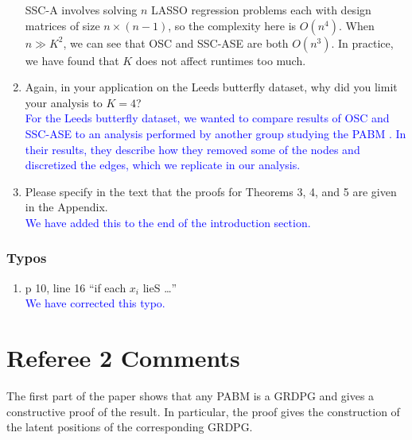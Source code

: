 \documentclass[
]{article}
\providecommand{\tightlist}{%
  \setlength{\itemsep}{0pt}\setlength{\parskip}{0pt}}
\begin{document}
\begin{enumerate}
{  SSC-A involves solving $n$ LASSO regression problems each with design matrices of size $n \times (n - 1)$, so the complexity here is $O(n^4)$. 
  When $n \gg K^2$, we can see that OSC and SSC-ASE are both $O(n^3)$. 
  In practice, we have found that $K$ does not affect runtimes too much. 
  }
\item
  Again, in your application on the Leeds butterfly dataset, why did you
  limit your analysis to \(K = 4\)?\\
  \textcolor{blue}{
  For the Leeds butterfly dataset, we wanted to compare results of OSC and SSC-ASE to an analysis performed by another group studying the PABM \citep{noroozi2019estimation}. 
  In their results, they describe how they removed some of the nodes and discretized the edges, which we replicate in our analysis. 
  }
\item
  Please specify in the text that the proofs for Theorems 3, 4, and 5
  are given in the Appendix.\\
  \textcolor{blue}{
  We have added this to the end of the introduction section.
  }
\end{enumerate}

\hypertarget{typos}{%
\subsubsection{Typos}\label{typos}}

\begin{enumerate}
\def\labelenumi{\arabic{enumi}.}
\tightlist
\item
  p 10, line 16 ``if each \(x_i\) lieS \ldots{}''\\
  \textcolor{blue}{
  We have corrected this typo. 
  }
\end{enumerate}

\hypertarget{referee-2-comments}{%
\section{Referee 2 Comments}\label{referee-2-comments}}

The first part of the paper shows that any PABM is a GRDPG and gives a
constructive proof of the result. In particular, the proof gives the
construction of the latent positions of the corresponding GRDPG.
\end{document}
